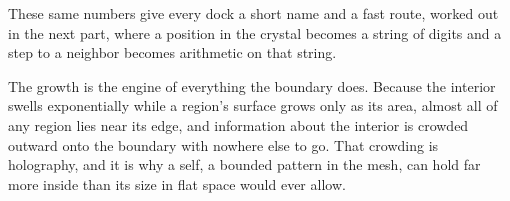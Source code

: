 These same numbers give every dock a short name and a fast route, worked out in the next part, where a position in the crystal becomes a string of digits and a step to a neighbor becomes arithmetic on that string.

The growth is the engine of everything the boundary does. Because the interior swells exponentially while a region's surface grows only as its area, almost all of any region lies near its edge, and information about the interior is crowded outward onto the boundary with nowhere else to go. That crowding is holography, and it is why a self, a bounded pattern in the mesh, can hold far more inside than its size in flat space would ever allow.
